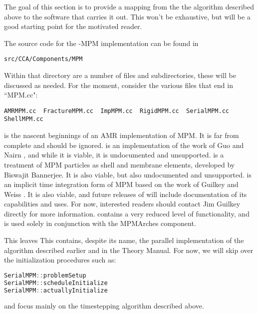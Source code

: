 The goal of this section is to provide a mapping from the the algorithm described above
to the software that carries it out.  This won't be exhaustive, but will be a
good starting point for the motivated reader.

The source code for the \Vaango-MPM implementation can be found in

\begin{lstlisting}[backgroundcolor=\color{background}]
src/CCA/Components/MPM
\end{lstlisting}
Within that directory are a number of files and subdirectories, these will be
discussed as needed.  For the moment, consider the various files that end in
``{MPM.cc}":
\begin{lstlisting}[backgroundcolor=\color{background}]
AMRMPM.cc  FractureMPM.cc  ImpMPM.cc  RigidMPM.cc  SerialMPM.cc  ShellMPM.cc
\end{lstlisting}

 is the nascent beginnings of an AMR implementation of MPM. 
It is far from complete and should be ignored.   is an implementation of
the work of Guo and Nairn \cite{GuoNairn}, and while it is viable, it is
undocumented and unsupported.   is a treatment of MPM particles
as shell and membrane elements, developed by Biswajit Bannerjee.  It is also
viable, but also undocumented and unsupported.   is an implicit
time integration form of MPM based on the work of Guilkey and Weiss
\cite{Guilkey2003}.  It is also viable, and future releases of \Vaango will include
documentation of its capabilities and uses.  For now, interested readers
should contact Jim Guilkey directly for more information.   contains
a very reduced level of functionality, and is used solely in conjunction with
the MPMArches component.

This leaves   This contains, despite its name, the parallel
implementation of the algorithm described earlier and in the \Vaango Theory Manual.
For now, we will skip over the initialization procedures such as:
\begin{lstlisting}[language=Cpp]
SerialMPM::problemSetup
SerialMPM::scheduleInitialize
SerialMPM::actuallyInitialize
\end{lstlisting}
and focus mainly on the timestepping algorithm described above.  

